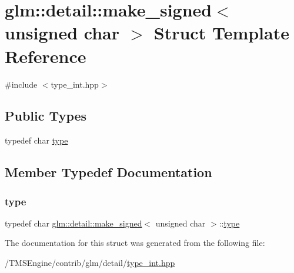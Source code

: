 \hypertarget{structglm_1_1detail_1_1make__signed_3_01unsigned_01char_01_4}{}\section{glm\+:\+:detail\+:\+:make\+\_\+signed$<$ unsigned char $>$ Struct Template Reference}
\label{structglm_1_1detail_1_1make__signed_3_01unsigned_01char_01_4}


{\ttfamily \#include $<$type\+\_\+int.\+hpp$>$}

\subsection*{Public Types}
\begin{DoxyCompactItemize}
\item 
typedef char \hyperlink{structglm_1_1detail_1_1make__signed_3_01unsigned_01char_01_4_a38e3001baf7964626c6e7dff83b4ba95}{type}
\end{DoxyCompactItemize}


\subsection{Member Typedef Documentation}
\mbox{\label{structglm_1_1detail_1_1make__signed_3_01unsigned_01char_01_4_a38e3001baf7964626c6e7dff83b4ba95}} 
\subsubsection{\texorpdfstring{type}{type}}
{\footnotesize\ttfamily typedef char \hyperlink{structglm_1_1detail_1_1make__signed}{glm\+::detail\+::make\+\_\+signed}$<$ unsigned char $>$\+::\hyperlink{structglm_1_1detail_1_1make__signed_3_01unsigned_01char_01_4_a38e3001baf7964626c6e7dff83b4ba95}{type}}



The documentation for this struct was generated from the following file\+:\begin{DoxyCompactItemize}
\item 
/\+T\+M\+S\+Engine/contrib/glm/detail/\hyperlink{type__int_8hpp}{type\+\_\+int.\+hpp}\end{DoxyCompactItemize}
